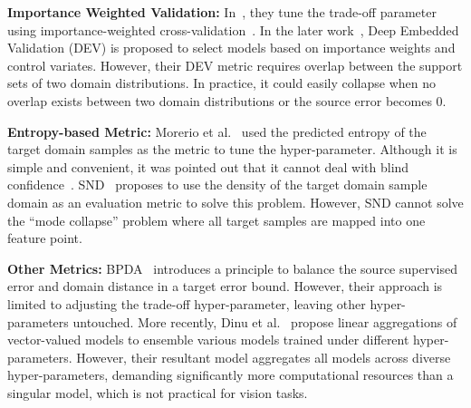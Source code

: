 \documentclass{article} %
\begin{document}
\textbf{Importance Weighted Validation:} In~\cite{CDAN}, they tune the trade-off parameter using importance-weighted cross-validation~\cite{IWV}. In the later work~\cite{DEV}, Deep Embedded Validation (DEV) is proposed to select models based on importance weights and control variates. However, their DEV metric requires overlap between the support sets of two domain distributions. In practice, it could easily collapse when no overlap exists between two domain distributions or the source error becomes 0.


\textbf{Entropy-based Metric:} Morerio et al.~\cite{C-Ent} used the predicted entropy of the target domain samples as the metric to tune the hyper-parameter. Although it is simple and convenient, it was pointed out that it cannot deal with blind confidence~\cite{SND}. SND~\cite{SND} proposes to use the density of the target domain sample domain as an evaluation metric to solve this problem. However, SND cannot solve the ``mode collapse'' problem where all target samples are mapped into one feature point.

\textbf{Other Metrics:} BPDA~\cite{Balancing} introduces a principle to balance the source supervised error and domain distance in a target error bound. However, their approach is limited to adjusting the trade-off hyper-parameter, leaving other hyper-parameters untouched. More recently, Dinu et al.~\cite{Aggregation} propose linear aggregations of vector-valued models to ensemble various models trained under different hyper-parameters. However, their resultant model aggregates all models across diverse hyper-parameters, demanding significantly more computational resources than a singular model, which is not practical for vision tasks.
\end{document}
